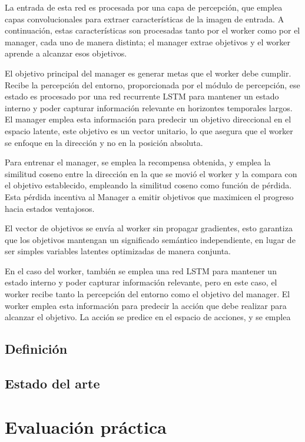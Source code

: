 \documentclass[letterpaper]{article} %
\begin{document}
La entrada de esta red es procesada por una capa de percepción, que emplea capas convolucionales
para extraer características de la imagen de entrada. A continuación, estas características son procesadas
tanto por el worker como por el manager, cada uno de manera distinta; el manager extrae objetivos y el worker
aprende a alcanzar esos objetivos.

El objetivo principal del manager es generar metas que el worker debe cumplir. Recibe la percepción
del entorno, proporcionada por el módulo de percepción, ese estado es procesado por una red recurrente LSTM
para mantener un estado interno y poder capturar información relevante en horizontes temporales largos.
El manager emplea esta información para predecir un objetivo direccional en el espacio latente, este objetivo
es un vector unitario, lo que asegura que el worker se enfoque en la dirección y no en la posición absoluta.

Para entrenar el manager, se emplea la recompensa obtenida, y emplea la similitud coseno entre la dirección en la que 
se movió el worker y la compara con el objetivo establecido, empleando la similitud coseno como función de pérdida.
Esta pérdida incentiva al Manager a emitir objetivos que maximicen el progreso hacia estados ventajosos.

El vector de objetivos se envía al worker sin propagar gradientes, esto garantiza que los objetivos 
mantengan un significado semántico independiente, en lugar de ser simples variables latentes optimizadas de manera conjunta.

En el caso del worker, también se emplea una red LSTM para mantener un estado interno y poder capturar información relevante,
pero en este caso, el worker recibe tanto la percepción del entorno como el objetivo del manager. El worker emplea esta información
para predecir la acción que debe realizar para alcanzar el objetivo. La acción se predice en el espacio de acciones, y se emplea


\subsection{Definición}

\subsection{Estado del arte}

\section{Evaluación práctica}
\end{document}
